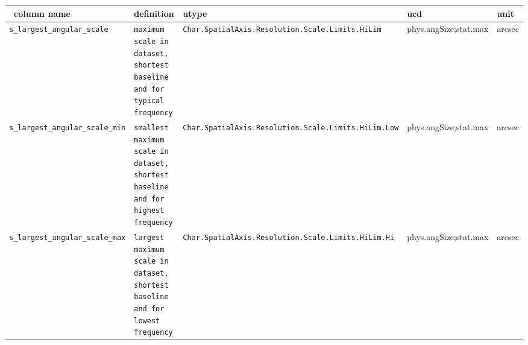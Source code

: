 \documentclass[11pt,a4paper]{ivoa}
\begin{document}
\begin{landscape}
\begin{longtable}{l p{4.5cm}| p{4cm}| l l |}
\hline
\
\textbf{column name}&\textbf{definition}&\textbf{utype}&\textbf{ucd}&\textbf{unit}\\
\hline
\texttt{s\_largest\_angular\_scale}&\texttt{maximum scale in dataset, shortest baseline and  for typical frequency}&\texttt{Char.SpatialAxis.\newline Resolution.Scale.\newline Limits.HiLim}&{phys.angSize;stat.max}&arcsec \\
\hline
\texttt{s\_largest\_angular\_scale\_min}&\texttt{smallest maximum scale in dataset, shortest baseline and for highest frequency}&\texttt{Char.SpatialAxis.\newline Resolution.Scale.\newline Limits.HiLim.Low}&{phys.angSize;stat.max}&arcsec \\
\hline
\texttt{s\_largest\_angular\_scale\_max}&\texttt{largest maximum scale in dataset, shortest baseline and  for lowest frequency}&\texttt{Char.SpatialAxis.\newline Resolution.Scale.\newline Limits.HiLim.Hi}&{phys.angSize;stat.max}&arcsec \\
\hline


\end{longtable}
\end{landscape}
\end{document}
